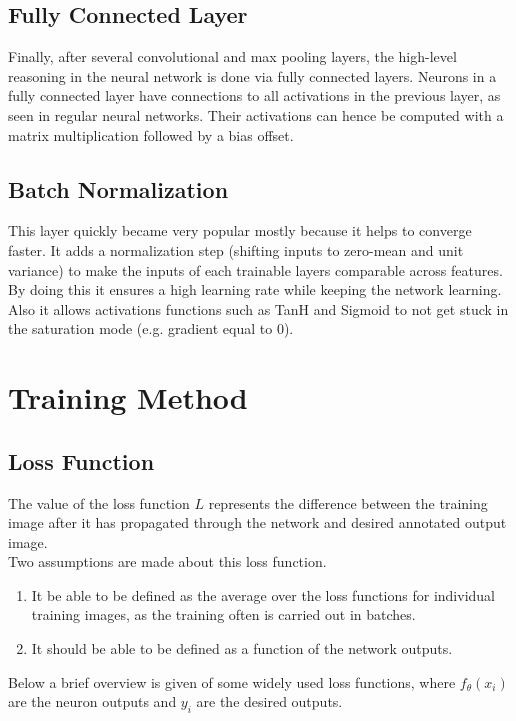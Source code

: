     \subsection{Fully Connected Layer}
    Finally, after several convolutional and max pooling layers, the high-level reasoning in the neural network is done via fully connected layers. Neurons in a fully connected layer have connections to all activations in the previous layer, as seen in regular neural networks. Their activations can hence be computed with a matrix multiplication followed by a bias offset. 

    \subsection{Batch Normalization}
    This layer quickly became very popular mostly because it helps to converge faster\cite{ioffe2015batch}. It adds a normalization step (shifting inputs to zero-mean and unit variance) to make the inputs of each trainable layers comparable across features. By doing this it ensures a high learning rate while keeping the network learning. \\

    Also it allows activations functions such as TanH and Sigmoid to not get stuck in the saturation mode (e.g. gradient equal to $0$).

    \section{Training Method}
    \subsection{Loss Function}
    The value of the loss function $L$ represents the difference between the training image after it has propagated through the network and desired annotated output image.\\ 

    Two assumptions are made about this loss function. 
    \begin{enumerate}
        \item It be able to be defined as the average over the loss functions for individual training images, as the training often is carried out in batches.
        \item It should be able to be defined as a function of the network outputs. 
    \end{enumerate}

    Below a brief overview is given of some widely used loss functions, where $f_{\theta}(x_i)$ are the neuron outputs and $y_i$ are the desired outputs.
